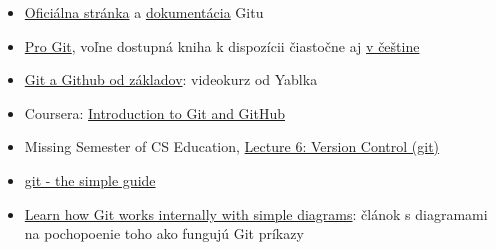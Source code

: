 \documentclass[a4paper,12pt,oneside]{article}
\begin{document}
\begin{itemize}
      \item
            \href{https://git-scm.com}{Oficiálna stránka} a
            \href{https://git-scm.com/doc}{dokumentácia} Gitu
      \item
            \href{https://git-scm.com/book/en/v2}{Pro Git},
            voľne dostupná kniha k dispozícii čiastočne aj
            \href{https://git-scm.com/book/cs/v2}{v češtine}

      \item
            \href{https://www.youtube.com/watch?v=0v5K4GvK4Gs}{Git a Github od základov}:
            videokurz od Yablka

      \item
            Coursera:
            \href{https://www.coursera.org/learn/introduction-git-github/}{Introduction to Git and GitHub}
      \item
            Missing Semester of CS Education,
            \href{https://www.youtube.com/watch?v=2sjqTHE0zok}{Lecture 6: Version Control (git)}

      \item
            \href{https://rogerdudler.github.io/git-guide/}{git - the simple guide}

      \item
            \href{https://medium.com/@praveenmuth2/learn-how-git-works-internally-with-simple-diagrams-a9349dc32831}{Learn how Git works internally with simple diagrams}:
            článok s diagramami na pochopoenie toho ako fungujú Git príkazy

\end{itemize}
\end{document}
